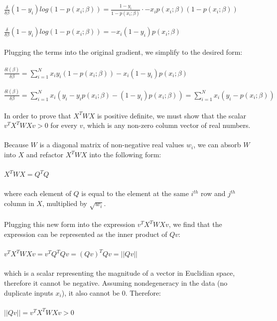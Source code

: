 \documentclass[12pt]{report}
\begin{document}
$\frac{\delta}{\delta\beta}(1-y_i)log(1-p(x_i;\beta))=\frac{1-y_i}{1-p(x_i;\beta)}\cdot-x_ip(x_i;\beta)(1-p(x_i;\beta))$
\\\\
$\frac{\delta}{\delta\beta}(1-y_i)log(1-p(x_i;\beta))=-x_i(1-y_i)p(x_i;\beta)$
\\\\
Plugging the terms into the original gradient, we simplify to the desired form:
\\\\
$\frac{\delta l(\beta)}{\delta\beta}=\sum_{i=1}^Nx_iy_i(1-p(x_i;\beta))-x_i(1-y_i)p(x_i;\beta)$
\\\\
$\frac{\delta l(\beta)}{\delta\beta}=\sum_{i=1}^Nx_i(y_i-y_ip(x_i;\beta)-(1-y_i)p(x_i;\beta))=\sum_{i=1}^Nx_i(y_i-p(x_i;\beta))$
\newpage
{}
\\\\
In order to prove that $X^TWX$ is positive definite, we must show that the scalar $v^TX^TWXv > 0$ for every $v$, which is any non-zero column vector of real numbers.
\\\\
Because $W$ is a diagonal matrix of non-negative real values $w_i$, we can absorb $W$ into $X$ and refactor $X^TWX$ into the following form:
\\\\
$X^TWX = Q^TQ$
\\\\
where each element of $Q$ is equal to the element at the same $i^{th}$ row and $j^{th}$ column in $X$, multiplied by $\sqrt{w_i}$.
\\\\
Plugging this new form into the expression $v^TX^TWXv$, we find that the expression can be represented as the inner product of $Qv$:
\\\\
$v^TX^TWXv = v^TQ^TQv = (Qv)^TQv = ||Qv||$
\\\\
which is a scalar representing the magnitude of a vector in Euclidian space, therefore it cannot be negative. Assuming nondegeneracy in the data (no duplicate inputs $x_i$), it also cannot be 0.
Therefore:
\\\\
$||Qv|| = v^TX^TWXv > 0$
\end{document}
